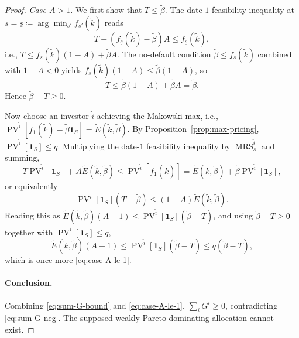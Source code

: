 \documentclass[11pt,a4paper,oneside]{book}
\def\1{\mathbf{1}}
\def\leq{\leqslant}
\def\geq{\geqslant}
\DeclareMathOperator{\MRS}{MRS}
\DeclareMathOperator{\PV}{PV}
\theoremstyle{plain}
\theoremstyle{definition}
\theoremstyle{remark}
\numberwithin{equation}{chapter}
\begin{document}
\begin{proof}
\textit{Case $A > 1$.}
We first show that $T \leq \widetilde{\beta}$.
The date-$1$ feasibility inequality at $s = \underline{s} \coloneqq \arg\min_{s'} f_{s'}(\widetilde{k})$ reads
\begin{equation*}
  T + (f_{\underline{s}}(\widetilde{k}) - \widetilde{\beta}) A \leq f_{\underline{s}}(\widetilde{k}),
\end{equation*}
i.e., $T \leq f_{\underline{s}}(\widetilde{k})(1 - A) + \widetilde{\beta} A$.
The no-default condition $\widetilde{\beta} \leq f_{\underline{s}}(\widetilde{k})$ combined with $1 - A < 0$ yields
$f_{\underline{s}}(\widetilde{k})(1 - A) \leq \widetilde{\beta}(1 - A)$, so
\begin{equation*}
  T \leq \widetilde{\beta}(1 - A) + \widetilde{\beta} A = \widetilde{\beta}.
\end{equation*}
Hence $\widetilde{\beta} - T \geq 0$.

Now choose an investor $\widehat{i}$ achieving the Makowski max, i.e., $\PV^{\widehat{i}}[f_1(\widetilde{k}) - \widetilde{\beta} \1_S] = \widetilde{E}(\widetilde{k}, \widetilde{\beta})$.
By Proposition~\ref{prop:max-pricing}, $\PV^{\widehat{i}}[\1_S] \leq q$.
Multiplying the date-$1$ feasibility inequality by $\MRS^{\widehat{i}}_s$ and summing,
\begin{equation*}
  T \PV^{\widehat{i}}[\1_S] + A \widetilde{E}(\widetilde{k}, \widetilde{\beta})
  \leq \PV^{\widehat{i}}[f_1(\widetilde{k})]
  = \widetilde{E}(\widetilde{k}, \widetilde{\beta}) + \widetilde{\beta} \PV^{\widehat{i}}[\1_S],
\end{equation*}
or equivalently
\begin{equation*}
  \PV^{\widehat{i}}[\1_S](T - \widetilde{\beta}) \leq (1 - A) \widetilde{E}(\widetilde{k}, \widetilde{\beta}).
\end{equation*}
Reading this as $\widetilde{E}(\widetilde{k}, \widetilde{\beta})(A - 1) \leq \PV^{\widehat{i}}[\1_S](\widetilde{\beta} - T)$, and using $\widetilde{\beta} - T \geq 0$ together with $\PV^{\widehat{i}}[\1_S] \leq q$,
\begin{equation*}
  \widetilde{E}(\widetilde{k}, \widetilde{\beta})(A - 1) \leq \PV^{\widehat{i}}[\1_S](\widetilde{\beta} - T) \leq q(\widetilde{\beta} - T),
\end{equation*}
which is once more \eqref{eq:case-A-le-1}.

\paragraph{Conclusion.}
Combining \eqref{eq:sum-G-bound} and \eqref{eq:case-A-le-1}, $\sum_i G^i \geq 0$, contradicting \eqref{eq:sum-G-neg}.
The supposed weakly Pareto-dominating allocation cannot exist.
\end{proof}
\end{document}
